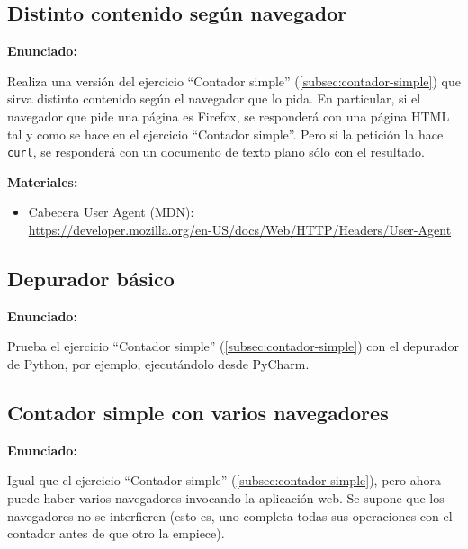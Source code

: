 \subsection{Distinto contenido según navegador}
\label{subsec:contador-simple-navegador}

\textbf{Enunciado:}

Realiza una versión del ejercicio ``Contador simple'' (\ref{subsec:contador-simple}) que sirva distinto contenido según el navegador que lo pida. En particular, si el navegador que pide una página es Firefox, se responderá con una página HTML tal y como se hace en el ejercicio ``Contador simple''. Pero si la petición la hace \verb|curl|, se responderá con un documento de texto plano sólo con el resultado.

\textbf{Materiales:}

\begin{itemize}
\item Cabecera User Agent (MDN): \\
  \url{https://developer.mozilla.org/en-US/docs/Web/HTTP/Headers/User-Agent}
\end{itemize}


\subsection{Depurador básico}
\label{subsec:depurador-basico}

\textbf{Enunciado:}

Prueba el ejercicio ``Contador simple'' (\ref{subsec:contador-simple}) con el depurador de Python, por ejemplo, ejecutándolo desde PyCharm.


\subsection{Contador simple con varios navegadores}
\label{subsec:contador-simple-varios}

\textbf{Enunciado:}

Igual que el ejercicio ``Contador simple'' (\ref{subsec:contador-simple}), pero ahora puede haber varios navegadores invocando la aplicación web. Se supone que los navegadores no se interfieren (esto es, uno completa todas sus operaciones con el contador antes de que otro la empiece).

